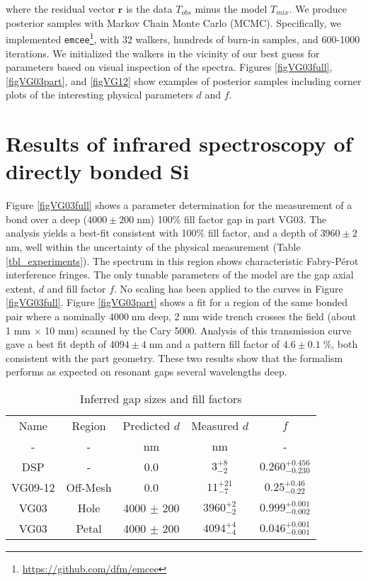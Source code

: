 \documentclass[osajnl,twocolumn,showpacs,superscriptaddress,11pt]{revtex4-1} %
\begin{document}
where the residual vector $\boldsymbol{r}$ is the data $T_{obs}$ minus the model $T_{mix}$.  We produce posterior samples with Markov Chain Monte Carlo (MCMC).  Specifically, we implemented \texttt{emcee}\footnote{\url{https://github.com/dfm/emcee}}\cite{emcee}, with 32 walkers, hundreds of burn-in samples, and 600-1000 iterations.  We initialized the walkers in the vicinity of our best guess for parameters based on visual inspection of the spectra.  Figures \ref{figVG03full}, \ref{figVG03part}, and \ref{figVG12} show examples of posterior samples including corner plots of the interesting physical parameters $d$ and $f$.

\section{Results of infrared spectroscopy of directly bonded Si}
\label{secResults}

Figure \ref{figVG03full} shows a parameter determination for the measurement of a bond over a deep ($4000 \pm 200\;$nm) 100\% fill factor gap in part VG03.  The analysis yields a best-fit consistent with 100\% fill factor, and a depth of $3960 \pm 2\;$nm, well within the uncertainty of the physical measurement (Table \ref{tbl_experiments}).  The spectrum in this region shows characteristic Fabry-P\'{e}rot interference fringes.  The only tunable parameters of the model are the gap axial extent, $d$ and fill factor $f$.  No scaling has been applied to the curves in Figure \ref{figVG03full}.  Figure \ref{figVG03part} shows a fit for a region of the same bonded pair where a nominally $4000\;$nm deep, 2 mm wide trench crosses the field (about 1 mm $\times$ 10 mm) scanned by the Cary 5000.  Analysis of this transmission curve gave a best fit depth of $4094 \pm 4\;$nm and a pattern fill factor of $4.6 \pm 0.1\;\%$, both consistent with the part geometry.  These two results show that the formalism performs as expected on resonant gaps several wavelengths deep.

\begin{table}[h!]
\caption{Inferred gap sizes and fill factors \label{tbl_DerivedGapSizes}}
\begin{center}
    \begin{tabular}{ c c c c c }
    \hline
    Name & Region & Predicted $d$ & Measured $d$ & $f$ \\
    -  & - & nm & nm & - \\
    \hline
    DSP & -    &   0.0  & $3^{+8}_{-2}$ & $0.260^{+0.456}_{-0.230}$\\
    VG09-12 & Off-Mesh    &   0.0  & $11^{+21}_{-7}$ & $0.25^{+0.46}_{-0.22}$\\
    VG03 & Hole    &   4000 $\pm$ 200  & $3960^{+2}_{-2}$ &  $0.999^{+0.001}_{-0.002}$\\
    VG03 & Petal   &   4000 $\pm$ 200  & $4094^{+4}_{-4}$ &  $0.046^{+0.001}_{-0.001}$\\
    \hline
    \end{tabular}
\end{center}
\end{table}
\end{document}
